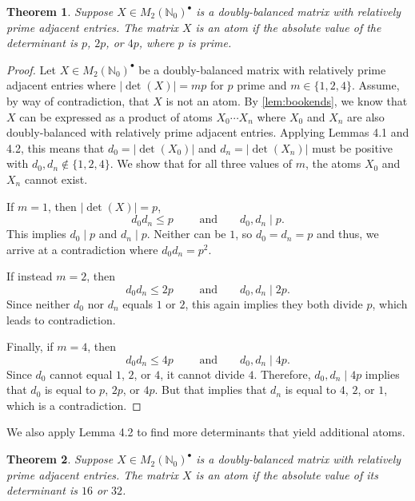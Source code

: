 \documentclass{amsart}
\newcommand{\mtwo}{M_2(\mathbb{N}_0)^\bullet}
\newcommand{\absdet}[1]{\left|\det\left( #1 \right)\right|}
\newtheorem{theorem}{Theorem}[section]
\begin{document}
\begin{theorem}\label{thm:absdetp}
    Suppose $X\in \mtwo$ is a doubly-balanced matrix with relatively prime adjacent entries. The matrix $X$ is an atom if the absolute value of the determinant is $p$, $2p$, or $4p$, where $p$ is prime.
\end{theorem}

\begin{proof}
    Let $X\in \mtwo$ be a doubly-balanced matrix with relatively prime adjacent entries where $\absdet{X}=mp$ for $p$ prime and $m\in\{1,2,4\}$. Assume, by way of contradiction, that $X$ is not an atom. By \cref{lem:bookends}, we know that $X$ can be expressed as a product of atoms $X_{0}\cdots X_{n}$ where $X_0$ and $X_n$ are also doubly-balanced with relatively prime adjacent entries.  Applying Lemmas 4.1 and 4.2, this means that $d_0=\absdet {X_0}$ and $d_n=\absdet{X_n}$ must be positive with $d_0,d_n\not \in \{1,2,4\}.$ We show that for all three values of $m$, the atoms $X_0$ and $X_n$ cannot exist. 
    
    If $m=1$, then $\absdet{X}=p$, $$d_0d_n \le p \qquad \text{ and} \qquad d_0,d_n\mid p.$$
    This implies $d_0\mid p$ and $d_n\mid p$. Neither can be $1$, so $d_0=d_n=p$ and thus, we arrive at a contradiction where $d_0 d_n=p^2.$
    
     If instead $m=2$, then $$d_0d_n \le 2p \qquad \text{ and} \qquad d_0,d_n\mid 2p.$$
    Since neither $d_0$ nor $d_n$ equals $1$ or $2$, this again implies they both divide $p$, which leads to contradiction.

     Finally, if $m=4$, then $$d_0d_n \le 4p \qquad \text{ and} \qquad d_0,d_n\mid 4p.$$
    Since $d_0$ cannot equal $1$, $2$, or $4$, it cannot divide $4$. 
    Therefore, $d_0, d_n\mid 4p$ implies that $d_0$ is equal to $p$, $2p$, or $4p$. But that implies that $d_n$ is equal to $4$, $2$, or $1$, which is a contradiction.
\end{proof}


We also apply Lemma 4.2 to find more determinants that yield additional atoms.

\begin{theorem} \label{thm:absdet32}
        Suppose $X\in \mtwo$ is a doubly-balanced matrix with relatively prime adjacent entries. The matrix $X$ is an atom if the absolute value of its determinant is $16$ or $32$.
\end{theorem}
\end{document}
